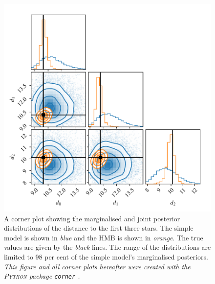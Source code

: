 
\begin{figure}
    \centering
    \includegraphics{figures/hbm-dist-corr.pdf}
    \caption[A corner plot showing the marginalised and joint posterior distributions of the distance to the first three stars]{A corner plot showing the marginalised and joint posterior distributions of the distance to the first three stars. The simple model is shown in \emph{blue} and the HMB is shown in \emph{orange}. The true values are given by the \emph{black} lines. The range of the distributions are limited to 98 per cent of the simple model's marginalised posteriors. \emph{This figure and all corner plots hereafter were created with the \textsc{Python} package \texttt{corner} \citep{Foreman-Mackey2016}.}}
    \label{fig:hbm-corr}
\end{figure}

